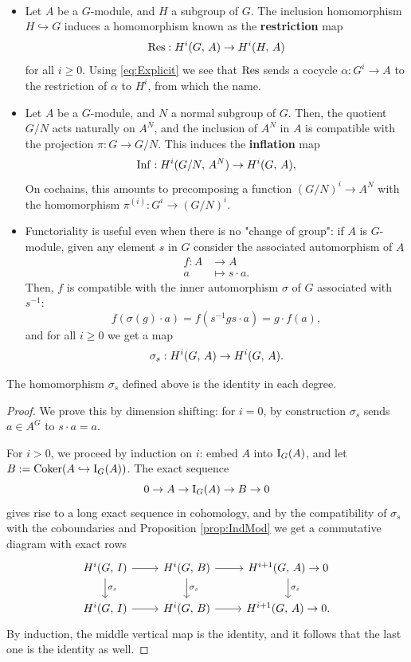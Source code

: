 \documentclass[a4paper, oneside]{memoir}
\begin{document}
\begin{definition}\
	\begin{itemize}
		\item   Let $A$ be a $G$-module, and $H$ a subgroup of $G$. The inclusion homomorphism $H\hookrightarrow G$ induces a homomorphism known as the \textbf{restriction} map
		      \[
			      \operatorname{Res}: H^{i}( G, \, A )\to H^{i}( H, \, A )
		      \]
		      for all $i\geq 0$. Using \eqref{eq:Explicit} we see that $\operatorname{Res}$ sends a cocycle $\alpha: G^i\to A$ to the restriction of $\alpha$ to $H^i$, from which the name.
		\item Let $A$ be a $G$-module, and $N$ a normal subgroup of $G$. Then, the quotient $G/N$ acts naturally on $A^N$, and the inclusion of $A^N$ in $A$ is compatible with the projection $\pi: G\to G/N$. This induces the \textbf{inflation} map
		      \[
			      \operatorname{Inf}: H^{i}( G/N, \, A^N )\to H^{i}( G, \, A ),
		      \]
		      On cochains, this amounts to precomposing a function $(G/N)^i\to A^N$ with the homomorphism $\pi^{(i)}: G^i\to (G/N)^i$.

		\item Functoriality is useful even when there is no "change of group": if $A$ is $G$-module, given any element $s$ in $G$ consider the associated automorphism of $A$
		      \begin{align*}
			      f: A & \to A            \\
			      a    & \mapsto s\cdot a
			      .\end{align*}
		      Then, $f$ is compatible with the inner automorphism $\sigma$ of $G$ associated with $s^{-1}$:
		      \[
			      f(\sigma(g)\cdot a)=f(s^{-1}gs\cdot a)=g\cdot f(a),
		      \]
		      and for all $i\geq 0$ we get a map
		      \[
			      \sigma_s: H^{i}( G, \, A )\to H^{i}( G, \, A )
			      .\]
	\end{itemize}
\end{definition}

\begin{proposition}\label{prop:ConjId}
	The homomorphism $\sigma_s$ defined above is the identity in each degree.
\end{proposition}
\begin{proof}
	We prove this by dimension shifting: for $i=0$, by construction $\sigma_s$ sends $a\in A^G$ to $s\cdot a=a$.

	For $i>0$, we proceed by induction on $i$: embed $A$ into $\operatorname{I}_{G}(A)$, and let $B:=\operatorname{Coker}(A\hookrightarrow \operatorname{I}_{G}(A))$. The exact sequence
	\[
		0\to A\to \operatorname{I}_{G}(A)\to B\to 0
	\]
	gives rise to a long exact sequence in cohomology, and by the compatibility of $\sigma_s$ with the coboundaries and Proposition \ref{prop:IndMod} we get a commutative diagram with exact rows
	\[
		\begin{tikzcd}
			\H{i}{G}{I} \arrow[r] \arrow[d, "\sigma_s"] & \H{i}{G}{B} \arrow[r] \arrow[d, "\sigma_s"] & \H{i+1}{G}{A} \arrow[d, "\sigma_s"] \to 0 \\
			\H{i}{G}{I} \arrow[r]                        & \H{i}{G}{B} \arrow[r]                        & \H{i+1}{G}{A} \to 0.
		\end{tikzcd}
	\]
	By induction, the middle vertical map is the identity, and it follows that the last one is the identity as well.
\end{proof}
\end{document}

